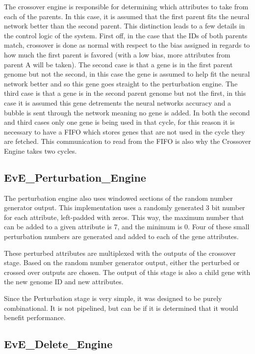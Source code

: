 \documentclass[preprint,pre,floats,aps,amsmath,amssymb]{revtex4}
\begin{document}
The crossover engine is responsible for determining which attributes to take from each of the parents. In this case, it is assumed that the first parent fits the neural network better than the second parent. This distinction leads to a few details in the control logic of the system. First off, in the case that the IDs of both parents match, crossover is done as normal with respect to the bias assigned in regards to how much the first parent is favored (with a low bias, more attributes from parent A will be taken). The second case is that a gene is in the first parent genome but not the second, in this case the gene is assumed to help fit the neural network better and so this gene goes straight to the perturbation engine. The third case is that a gene is in the second parent genome but not the first, in this case it is assumed this gene detrements the neural networks accuracy and a bubble is sent through the network meaning no gene is added. In both the second and third cases only one gene is being used in that cycle, for this reason it is necessary to have a FIFO which stores genes that are not used in the cycle they are fetched. This communication to read from the FIFO is also why the Crossover Engine takes two cycles.


\subsection{EvE\_Perturbation\_Engine}

The perturbation engine also uses windowed sections of the random number generator output. This implementation uses a randomly generated 3 bit number for each attribute, left-padded with zeros. This way, the maximum number that can be added to a given attribute is 7, and the minimum is 0. Four of these small perturbation numbers are generated and added to each of the gene attributes.

These perturbed attributes are multiplexed with the outputs of the crossover stage. Based on the random number generator output, either the perturbed or crossed over outputs are chosen. The output of this stage is also a child gene with the new genome ID and new attributes.

Since the Perturbation stage is very simple, it was designed to be purely combinational. It is not pipelined, but can be if it is determined that it would benefit performance.


\subsection{EvE\_Delete\_Engine}
\end{document}
